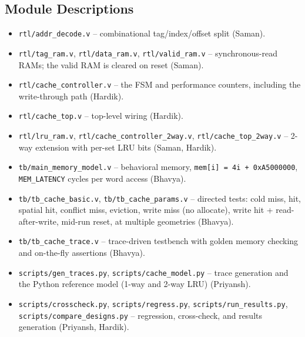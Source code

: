 \documentclass[conference]{IEEEtran}
\begin{document}
\subsection{Module Descriptions}
\begin{itemize}
  \item \texttt{rtl/addr\_decode.v} -- combinational tag/index/offset split
        (Saman).
  \item \texttt{rtl/tag\_ram.v}, \texttt{rtl/data\_ram.v},
        \texttt{rtl/valid\_ram.v} -- synchronous-read RAMs; the valid RAM is
        cleared on reset (Saman).
  \item \texttt{rtl/cache\_controller.v} -- the FSM and performance counters,
        including the write-through path (Hardik).
  \item \texttt{rtl/cache\_top.v} -- top-level wiring (Hardik).
  \item \texttt{rtl/lru\_ram.v}, \texttt{rtl/cache\_controller\_2way.v},
        \texttt{rtl/cache\_top\_2way.v} -- 2-way extension with per-set LRU
        bits (Saman, Hardik).
  \item \texttt{tb/main\_memory\_model.v} -- behavioral memory,
        \texttt{mem[i] = 4i + 0xA5000000}, \texttt{MEM\_LATENCY} cycles per
        word access (Bhavya).
  \item \texttt{tb/tb\_cache\_basic.v}, \texttt{tb/tb\_cache\_params.v} --
        directed tests: cold miss, hit, spatial hit, conflict miss, eviction,
        write miss (no allocate), write hit + read-after-write, mid-run
        reset, at multiple geometries (Bhavya).
  \item \texttt{tb/tb\_cache\_trace.v} -- trace-driven testbench with golden
        memory checking and on-the-fly assertions (Bhavya).
  \item \texttt{scripts/gen\_traces.py}, \texttt{scripts/cache\_model.py} --
        trace generation and the Python reference model (1-way and 2-way
        LRU) (Priyansh).
  \item \texttt{scripts/crosscheck.py}, \texttt{scripts/regress.py},
        \texttt{scripts/run\_results.py}, \texttt{scripts/compare\_designs.py}
        -- regression, cross-check, and results generation (Priyansh,
        Hardik).
\end{itemize}
\end{document}
